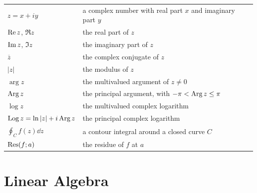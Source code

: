 {\begin{longtable}{@{}L{0.27\textwidth}L{0.65\textwidth}@{}}
        $z=x+iy$ & a complex number with real part $x$ and imaginary part $y$ \\
        $\operatorname{Re} z$, $\Re z$ & the real part of $z$ \\
        $\operatorname{Im} z$, $\Im z$ & the imaginary part of $z$ \\
        $\overline{z}$ & the complex conjugate of $z$ \\
        $|z|$ & the modulus of $z$ \\
        $\arg z$ & the multivalued argument of $z\neq0$ \\
        $\operatorname{Arg} z$ & the principal argument, with $-\pi<\operatorname{Arg} z\leq\pi$ \\
        $\log z$ & the multivalued complex logarithm \\
        $\operatorname{Log} z=\ln|z|+i\operatorname{Arg} z$ & the principal complex logarithm \\
        $\displaystyle\oint_C f(z)\dd z$ & a contour integral around a closed curve $C$ \\
        $\operatorname{Res}(f;a)$ & the residue of $f$ at $a$ \\
    \end{longtable}
    }

    \section*{Linear Algebra}

